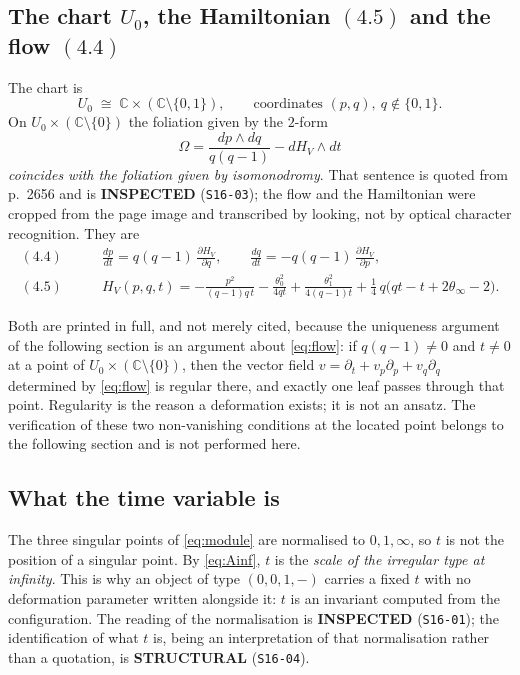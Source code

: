 \subsection{The chart \texorpdfstring{$U_0$}{U0}, the Hamiltonian
\texorpdfstring{$(4.5)$}{(4.5)} and the flow
\texorpdfstring{$(4.4)$}{(4.4)}}\label{ssec:flow}

The chart is
\begin{equation}\label{eq:chart}
  U_0\;\cong\;\mathbb C\times(\mathbb C\setminus\{0,1\}),
  \qquad\text{coordinates }(p,q),\ q\notin\{0,1\}.
\end{equation}
On $U_0\times(\mathbb C\setminus\{0\})$ the foliation given by the $2$-form
\begin{equation}\label{eq:omega}
  \Omega=\frac{dp\wedge dq}{q(q-1)}-dH_V\wedge dt
\end{equation}
\emph{coincides with the foliation given by isomonodromy}. That sentence is
quoted from p.~2656 and is \textbf{INSPECTED} (\texttt{S16-03}); the flow and
the Hamiltonian were cropped from the page image and transcribed by looking,
not by optical character recognition. They are
\begin{align}
  (4.4)\qquad
  &\frac{dp}{dt}=q(q-1)\,\frac{\partial H_V}{\partial q},
   \qquad
   \frac{dq}{dt}=-q(q-1)\,\frac{\partial H_V}{\partial p},
   \label{eq:flow}\\[4pt]
  (4.5)\qquad
  &H_V(p,q,t)=-\frac{p^2}{(q-1)q\,t}
     -\frac{\theta_0^2}{4qt}
     +\frac{\theta_1^2}{4(q-1)t}
     +\tfrac14\,q\bigl(qt-t+2\theta_\infty-2\bigr).
   \label{eq:HV}
\end{align}

Both are printed in full, and not merely cited, because the uniqueness argument
of the following section is an argument about \eqref{eq:flow}: if
$q(q-1)\neq0$ and $t\neq0$ at a point of $U_0\times(\mathbb C\setminus\{0\})$,
then the vector field
$v=\partial_t+v_p\partial_p+v_q\partial_q$ determined by \eqref{eq:flow} is
regular there, and exactly one leaf passes through that point. Regularity is
the reason a deformation exists; it is not an ansatz. The verification of
these two non-vanishing conditions at the located point belongs to the
following section and is not performed here.

\subsection{What the time variable is}\label{ssec:time}

The three singular points of \eqref{eq:module} are normalised to $0,1,\infty$,
so $t$ is not the position of a singular point. By \eqref{eq:Ainf}, $t$ is the
\emph{scale of the irregular type at infinity}. This is why an object of type
$(0,0,1,-)$ carries a fixed $t$ with no deformation parameter written alongside
it: $t$ is an invariant computed from the configuration. The reading of the
normalisation is \textbf{INSPECTED} (\texttt{S16-01}); the identification of
what $t$ is, being an interpretation of that normalisation rather than a
quotation, is \textbf{STRUCTURAL} (\texttt{S16-04}).

